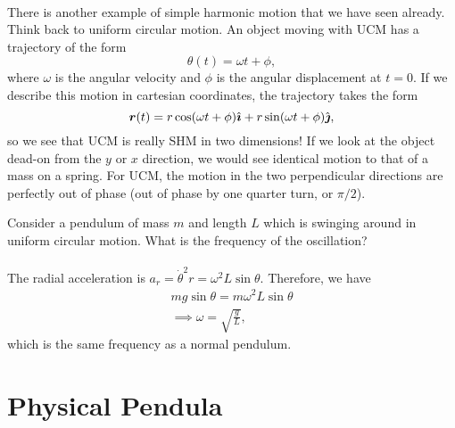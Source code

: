 \documentclass[../classical_mechanics.tex]{subfiles}
\begin{document}
        \paragraph{}
        There is another example of simple harmonic motion that we have seen already.
        Think back to uniform circular motion.
        An object moving with UCM has a trajectory of the form
        \begin{equation}
            \theta(t)=\omega t+\phi,
        \end{equation}
        where $\omega$ is the angular velocity and $\phi$ is the angular displacement at $t=0$.
        If we describe this motion in cartesian coordinates, the trajectory takes the form
        \begin{equation}
            \boldsymbol{r}(t)=r\cos(\omega t+\phi)\hat{\boldsymbol{\imath}}+r\sin(\omega t+\phi)\hat{\boldsymbol{\jmath}},
        \end{equation}
        so we see that UCM is really SHM in two dimensions!
        If we look at the object dead-on from the $y$ or $x$ direction, we would see identical motion to that of a mass on a spring.
        For UCM, the motion in the two perpendicular directions are perfectly out of phase (out of phase by one quarter turn, or $\pi/2$).
        \begin{example}
            Consider a pendulum of mass $m$ and length $L$ which is swinging around in uniform circular motion.
            What is the frequency of the oscillation?

            \paragraph{}
            The radial acceleration is $a_r=\dot{\theta}^2r=\omega^2L\sin\theta$.
            Therefore, we have
            \begin{gather}
                mg\sin\theta=m\omega^2L\sin\theta\\
                \implies\omega=\sqrt{\frac{g}{L}},
            \end{gather}
            which is the same frequency as a normal pendulum.
        \end{example}

    \section{Physical Pendula}
\end{document}
